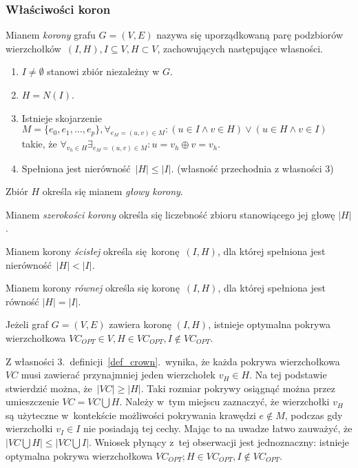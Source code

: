 \subsubsection{\textbf{Właściwości koron}}
\label{sss_kernelization_crown_main}
\begin{definition}
  Mianem \emph{korony} grafu $G=(V, E)$ nazywa się uporządkowaną parę
  podzbiorów wierzchołków $(I, H), I \subseteq V, H \subset V$, zachowujących
  następujące własności.
  \begin{enumerate}
    \item $I \neq \emptyset$ stanowi zbiór niezależny w $G$.
    \item $H=N(I)$.
    \item Istnieje skojarzenie $M=\{e_0, e_1, \ldots, e_p\}, \forall_{e_M=(u,v) \in
      M}: (u\in I \land v\in H) \lor (u \in H \land v \in I)$ takie, że
      $\forall_{v_h \in H}\exists_{e_M=(u,v)\in M}: u = v_h \oplus v = v_h$.
    \item Spełniona jest nierówność $|H| \leq |I|$. (własność przechodnia z własności 3)
  \end{enumerate}
\end{definition}
\begin{definition}
  Zbiór $H$ określa się mianem \emph{głowy korony}.
\end{definition}
\begin{definition}
  Mianem \emph{szerokości korony} określa się liczebność zbioru stanowiącego jej głowę $|H|$.
\end{definition}
\begin{definition}
  Mianem korony \emph{ścisłej} określa się koronę $(I, H)$, dla której spełniona jest nierówność $|H| < |I|$.
\end{definition}
\begin{definition}
  Mianem korony \emph{równej} określa się koronę $(I, H)$, dla której spełniona jest równość $|H| = |I|$.
\end{definition}
\begin{theorem}
  Jeżeli graf $G=(V,E)$ zawiera koronę $(I,H)$, istnieje optymalna pokrywa 
  wierzchołkowa $VC_{OPT} \in V, H \in VC_{OPT}, I \notin VC_{OPT}$.
\end{theorem}
\begin{bproof}
  Z własności 3.\ definicji~\ref{def_crown}.\ wynika, że każda pokrywa 
  wierzchołkowa $VC$ musi zawierać przynajmniej jeden wierzchołek $v_H \in H$.
  Na tej podstawie stwierdzić można, że $|VC|\geq|H|$.
  Taki rozmiar pokrywy osiągnąć można przez umieszczenie $VC=VC\bigcup H$.
  Należy w~tym miejscu zaznaczyć, że wierzchołki $v_H$ są użyteczne w~kontekście
  możliwości pokrywania krawędzi $e \notin M$, podczas gdy wierzchołki $v_I \in
  I$ nie posiadają tej cechy.
  Mając to na uwadze łatwo zauważyć, że $|VC \bigcup H| \leq |VC \bigcup
  I|$.
  Wniosek płynący z~tej obserwacji jest jednoznaczny: istnieje optymalna pokrywa
  wierzchołkowa $VC_{OPT}; H \in VC_{OPT}, I \notin VC_{OPT}$.
\end{bproof}
